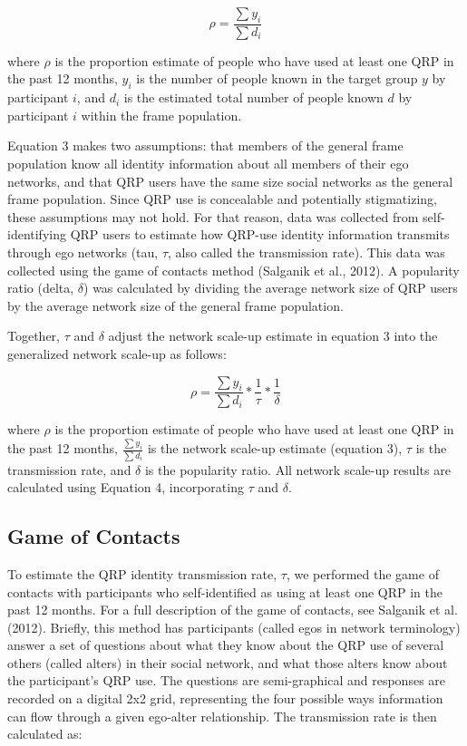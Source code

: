 \documentclass[man]{apa6}
\theoremstyle{definition}
\theoremstyle{definition}
\theoremstyle{definition}
\theoremstyle{remark}
\begin{document}
\begin{equation}
\rho = \frac{\sum y_i}{\sum d_i}
\end{equation}

where \(\rho\) is the proportion estimate of people who have used at
least one QRP in the past 12 months, \(y_i\) is the number of people
known in the target group \(y\) by participant \(i\), and \(d_i\) is the
estimated total number of people known \(d\) by participant \(i\) within
the frame population.

Equation 3 makes two assumptions: that members of the general frame
population know all identity information about all members of their ego
networks, and that QRP users have the same size social networks as the
general frame population. Since QRP use is concealable and potentially
stigmatizing, these assumptions may not hold. For that reason, data was
collected from self-identifying QRP users to estimate how QRP-use
identity information transmits through ego networks (tau, \(\tau\), also
called the transmission rate). This data was collected using the game of
contacts method (Salganik et al., 2012). A popularity ratio (delta,
\(\delta\)) was calculated by dividing the average network size of QRP
users by the average network size of the general frame population.

Together, \(\tau\) and \(\delta\) adjust the network scale-up estimate
in equation 3 into the generalized network scale-up as follows:

\begin{equation}
\rho = \frac{\sum y_i}{\sum d_i} * \frac{1}{\tau} * \frac{1}{\delta}
\end{equation}

where \(\rho\) is the proportion estimate of people who have used at
least one QRP in the past 12 months, \(\frac{\sum y_i}{\sum d_i}\) is
the network scale-up estimate (equation 3), \(\tau\) is the transmission
rate, and \(\delta\) is the popularity ratio. All network scale-up
results are calculated using Equation 4, incorporating \(\tau\) and
\(\delta\).

\subsection{Game of Contacts}\label{game-of-contacts}

To estimate the QRP identity transmission rate, \(\tau\), we performed
the game of contacts with participants who self-identified as using at
least one QRP in the past 12 months. For a full description of the game
of contacts, see Salganik et al. (2012). Briefly, this method has
participants (called egos in network terminology) answer a set of
questions about what they know about the QRP use of several others
(called alters) in their social network, and what those alters know
about the participant's QRP use. The questions are semi-graphical and
responses are recorded on a digital 2x2 grid, representing the four
possible ways information can flow through a given ego-alter
relationship. The transmission rate is then calculated as:
\end{document}
